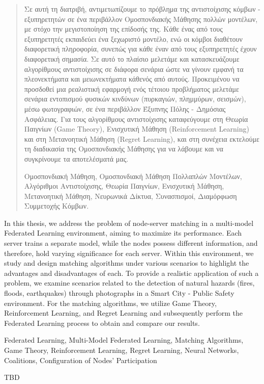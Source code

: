 \renewcommand{\abstractname}{Περίληψη}

\begin{abstract}
Σε αυτή τη διατριβή, αντιμετωπίζουμε το πρόβλημα της αντιστοίχισης κόμβων - εξυπηρετητών σε ένα περιβάλλον Ομοσπονδιακής Μάθησης πολλών μοντέλων, με στόχο την μεγιστοποίηση της επίδοσής της. Κάθε ένας από τους εξυπηρετητές εκπαιδεύει ένα ξεχωριστό μοντέλο, ενώ οι κόμβοι διαθέτουν διαφορετική πληροφορία, συνεπώς για κάθε έναν από τους εξυπηρετητές έχουν διαφορετική σημασία. Σε αυτό το πλαίσιο μελετάμε και κατασκευάζουμε αλγορίθμους αντιστοίχισης σε διάφορα σενάρια ώστε να γίνουν εμφανή τα πλεονεκτήματα και μειωνεκτήματα κάθενός από αυτούς. Προκειμένου να προσδοθεί μια ρεαλιστική εφαρμογή ενός τέτοιου προβλήματος μελετάμε σενάρια εντοπισμού φυσικών κινδύνων (πυρκαγιών, πλημμύρων, σεισμών), μέσω φωτογραφιών, σε ένα περιβάλλον Έξυπνης Πόλης - Δημόσιας Ασφάλειας. Για τους αλγορίθμους αντιστοίχισης καταφεύγουμε στη Θεωρία Παιγνίων (Game Theory), Ενισχυτική Μάθηση (Reinforcement Learning) και στη Μετανοητική Μάθηση (Regret Learning), και στη συνέχεια εκτελούμε τη διαδικασία της Ομοσπονδιακής Μάθησης για να λάβουμε και να συγκρίνουμε τα αποτελέσματά μας.    
  
\begin{keywords}
  Ομοσπονδιακή Μάθηση, Ομοσπονδιακή Μάθηση Πολλαπλών Μοντέλων, Αλγόριθμοι Αντιστοίχισης, Θεωρία Παιγνίων, Ενισχυτική Μάθηση, Μετανοητική Μάθηση, Νευρωνικά Δίκτυα, Συνασπισμοί, Διαμόρφωση Συμμετοχής Κόμβων.
\end{keywords}

\end{abstract}


\begin{abstracteng}
  In this thesis, we address the problem of node-server matching in a multi-model Federated Learning environment, aiming to maximize its performance. Each server trains a separate model, while the nodes possess different information, and therefore, hold varying significance for each server. Within this environment, we study and design matching algorithms under various scenarios to highlight the advantages and disadvantages of each. To provide a realistic application of such a problem, we examine scenarios related to the detection of natural hazards (fires, floods, earthquakes) through photographs in a Smart City - Public Safety environment. For the matching algorithms, we utilize Game Theory, Reinforcement Learning, and Regret Learning and subsequently perform the Federated Learning process to obtain and compare our results.

\begin{keywordseng}
    Federated Learning, Multi-Model Federated Learning, Matching Algorithms, Game Theory, Reinforcement Learning, Regret Learning, Neural Networks, Coalitions, Configuration of Nodes' Participation
\end{keywordseng}
\end{abstracteng}

\begin{acknowledgements}

TBD


\bigskip

\bigskip

\bigskip

\end{acknowledgements}